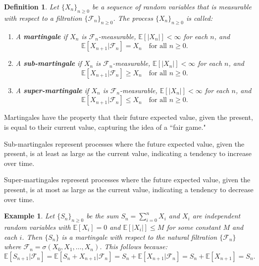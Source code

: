 \documentclass[letter,11pt]{article}
\newtheorem{definition}{Definition}[section]
\newtheorem{example}{Example}[section]
\begin{document}
\begin{definition}
Let \( \{X_n\}_{n \geq 0} \) be a sequence of random variables that is measurable with respect to a filtration \( \{\mathcal{F}_n\}_{n \geq 0} \). The process \( \{X_n\}_{n \geq 0} \) is called:
\begin{enumerate}
    \item A \textbf{martingale} if \( X_n \) is \( \mathcal{F}_n \)-measurable, \( \mathbb{E}[|X_n|] < \infty \) for each \( n \), and
    \[
    \mathbb{E}[X_{n+1} | \mathcal{F}_n] = X_n \quad \text{for all } n \geq 0.
    \]
    \item A \textbf{sub-martingale} if \( X_n \) is \( \mathcal{F}_n \)-measurable, \( \mathbb{E}[|X_n|] < \infty \) for each \( n \), and
    \[
    \mathbb{E}[X_{n+1} | \mathcal{F}_n] \geq X_n \quad \text{for all } n \geq 0.
    \]
    \item A \textbf{super-martingale} if \( X_n \) is \( \mathcal{F}_n \)-measurable, \( \mathbb{E}[|X_n|] < \infty \) for each \( n \), and
    \[
    \mathbb{E}[X_{n+1} | \mathcal{F}_n] \leq X_n \quad \text{for all } n \geq 0.
    \]
\end{enumerate}
\end{definition}

Martingales have the property that their future expected value, given the present, is equal to their current value, capturing the idea of a ``fair game."

Sub-martingales represent processes where the future expected value, given the present, is at least as large as the current value, indicating a tendency to increase over time.

Super-martingales represent processes where the future expected value, given the present, is at most as large as the current value, indicating a tendency to decrease over time.



\begin{example} \label{Ex:martingale}
Let \( \{S_n\}_{n \geq 0} \) be the sum \( S_n = \sum_{i=0}^n X_i \) and \( X_i \) are independent random variables with $\mathbb{E}[X_{i}] =0$ and $\mathbb{E}[ | X_{i} | ] \leq M$ for some constant $M$ and each $i$. Then \( \{S_n\} \) is a martingale with respect to the natural filtration \( \{\mathcal{F}_n\} \) where \( \mathcal{F}_n = \sigma(X_{0},X_1, \ldots, X_n) \). This follows because:
\[
\mathbb{E}[S_{n+1} | \mathcal{F}_n] = \mathbb{E}[S_n + X_{n+1} | \mathcal{F}_n] = S_n + \mathbb{E}[X_{n+1} | \mathcal{F}_n] = S_n + \mathbb{E}[X_{n+1} ] = S_{n}.
\]
\end{example}
\end{document}
